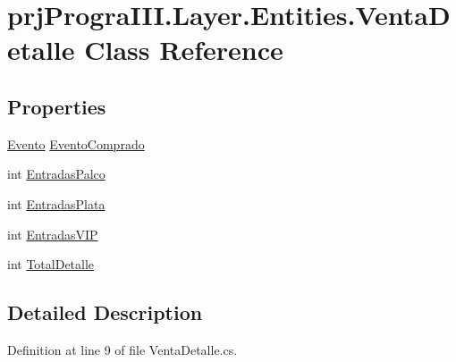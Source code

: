 \hypertarget{classprj_progra_i_i_i_1_1_layer_1_1_entities_1_1_venta_detalle}{}\section{prj\+Progra\+I\+I\+I.\+Layer.\+Entities.\+Venta\+Detalle Class Reference}
\label{classprj_progra_i_i_i_1_1_layer_1_1_entities_1_1_venta_detalle}
\subsection*{Properties}
\begin{DoxyCompactItemize}
\item 
\hyperlink{classprj_progra_i_i_i_1_1_layer_1_1_entities_1_1_evento}{Evento} \hyperlink{classprj_progra_i_i_i_1_1_layer_1_1_entities_1_1_venta_detalle_addeb3e0d30510828f3756f8c3b034073}{Evento\+Comprado}
\item 
int \hyperlink{classprj_progra_i_i_i_1_1_layer_1_1_entities_1_1_venta_detalle_a7cdd2ca027f142ecfa0f52a8256e7df6}{Entradas\+Palco}
\item 
int \hyperlink{classprj_progra_i_i_i_1_1_layer_1_1_entities_1_1_venta_detalle_a463a6017e1e132acd3d4dd9421a617a5}{Entradas\+Plata}
\item 
int \hyperlink{classprj_progra_i_i_i_1_1_layer_1_1_entities_1_1_venta_detalle_a274fc6851158cadff65ca91c1241d944}{Entradas\+V\+IP}
\item 
int \hyperlink{classprj_progra_i_i_i_1_1_layer_1_1_entities_1_1_venta_detalle_a08d36cbbedd9f17355a2ebca10a4db0a}{Total\+Detalle}
\end{DoxyCompactItemize}


\subsection{Detailed Description}


Definition at line 9 of file Venta\+Detalle.\+cs.



